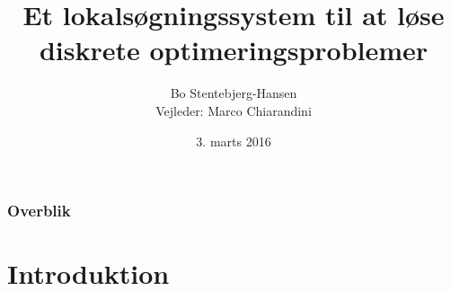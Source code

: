 \documentclass[smaller,handouts]{beamer}
\title[]{Et lokalsøgningssystem til at løse diskrete 
optimeringsproblemer}%
\author[]{Bo Stentebjerg-Hansen\\{ \scriptsize Vejleder: Marco Chiarandini}}
\institute[IMADA] 
{
Syddansk Universitet \\ %
\medskip
Institut for Matematik og Datalogi
}
\date{3. marts 2016} %
\begin{document}
\begin{frame}
\titlepage %

\end{frame}

\begin{frame}
\frametitle{Overblik} %
\tableofcontents %
\end{frame}


\section{Introduktion} %
\end{document}
